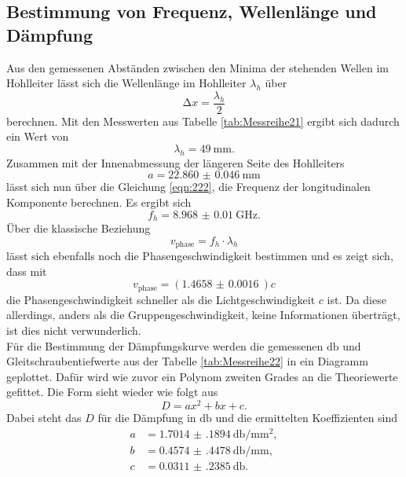 \subsection{Bestimmung von Frequenz, Wellenlänge und Dämpfung}

Aus den gemessenen Abständen zwischen den Minima der stehenden Wellen im Hohlleiter lässt sich die Wellenlänge im Hohlleiter $\lambda_h$ über
\begin{equation}
\increment x = \frac{\lambda_h}{2}
\end{equation}
berechnen. Mit den Messwerten aus Tabelle \ref{tab:Messreihe21} ergibt sich dadurch ein Wert von
\begin{equation}
\lambda_h = \SI{49}{\milli\meter}.
\end{equation}
Zusammen mit der Innenabmessung der längeren Seite des Hohlleiters
\begin{equation}
a = \SI{22.860(46)}{\milli\meter}
\end{equation}
lässt sich nun über die Gleichung \ref{eqn:222}, die Frequenz der longitudinalen Komponente berechnen.
Es ergibt sich 
\begin{equation}
f_h = \SI{8.968(10)}{\giga\hertz}.
\end{equation}
Über die klassische Beziehung 
\begin{equation}
v_{\text{phase}} = f_h \cdot \lambda_h
\end{equation}
lässt sich ebenfalls noch die Phasengeschwindigkeit bestimmen und es zeigt sich, dass mit 
\begin{equation}
v_{\text{phase}} = \left(\SI{1.4658(16)}{}\right) c
\end{equation}
die Phasengeschwindigkeit schneller als die Lichtgeschwindigkeit $c$ ist. Da diese allerdings, anders als die Gruppengeschwindigkeit, keine Informationen überträgt, ist dies nicht verwunderlich.
\\
\newline
Für die Bestimmung der Dämpfungskurve werden die gemessenen $\si{\decibel}$ und Gleitschraubentiefwerte aus der Tabelle \ref{tab:Messreihe22} in ein Diagramm geplottet.
Dafür wird wie zuvor ein Polynom zweiten Grades an die Theoriewerte gefittet. Die Form sieht wieder wie folgt aus
\begin{equation}
D = ax^2 + bx + c.
\end{equation}
Dabei steht das $D$ für die Dämpfung in $\si{\decibel}$ und die ermittelten Koeffizienten sind
\begin{align*}
a &= \SI{1.7014(1894)}{\decibel\per\milli\meter\squared}, \\
b &= \SI{0.4574(4478)}{\decibel\per\milli\meter}, \\
c &= \SI{0.0311(2385)}{\decibel}.
\end{align*}
